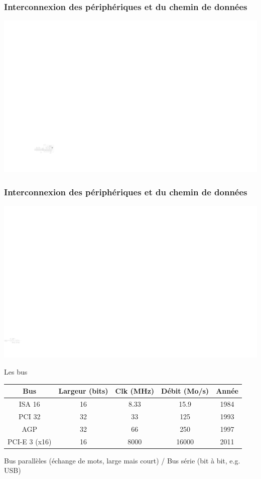 \documentclass{beamer}
\begin{document}
\begin{frame}

\frametitle{Interconnexion des périphériques et du chemin de données}

\includegraphics[width=\linewidth]{Figs/chemin_peripherique.pdf}

\end{frame}

\begin{frame}

\frametitle{Interconnexion des périphériques et du chemin de données}

\includegraphics[width=\linewidth]{Figs/buses.pdf}

\begin{block}{Les bus}
\begin{small}
\begin{tabular}{ccccc}
Bus & Largeur (bits)  & Clk (MHz) & Débit (Mo/s)& Année\\
\hline
ISA 16 & 16  & 8.33 & 15.9 & 1984\\
PCI 32 & 32  & 33 & 125& 1993\\
AGP & 32	&66	&250 & 1997\\
PCI-E 3 (x16) & 16 & 8000 & 16000 & 2011
\end{tabular}
\end{small}
\end{block}

Bus parallèles (échange de mots, large mais court) / Bus série (bit à bit, e.g. USB)

\end{frame}
\end{document}
